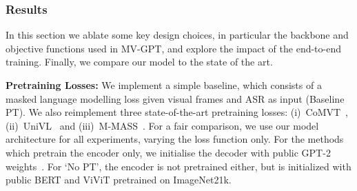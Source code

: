 \documentclass[10pt,twocolumn,letterpaper]{article}
\begin{document}
\subsubsection{Results}
In this section we ablate some key design choices, in particular the backbone and objective functions used in MV-GPT, and explore the impact of the end-to-end training.
Finally, we compare our model to the state of the art.


\begin{table}[t]
    \centering
    \caption{
    Comparisons to existing pretraining losses on YouCook2. 
    \textbf{PT} stands for pretraining. \textbf{PT parts} indicates which part of the model are pretrained, encoder (E) or both encoder and decoder (E + D).
    We reimplement the loss functions of existing methods but use our model and training strategies for fair comparison. 
    } 
    \label{tab:comps-loss}
\end{table}



\noindent\textbf{Pretraining Losses:} 
We implement a simple baseline, which consists of a masked language modelling loss given visual frames and ASR as input (Baseline PT). 
We also reimplement three state-of-the-art pretraining losses: (i)~CoMVT~\cite{seo2021look}, (ii)~UniVL~\cite{luo2020univl} and (iii)~M-MASS~\cite{huang2020multimodal}. For a fair comparison, we use our model architecture for all experiments, varying the loss function only. For the methods which pretrain the encoder only, we initialise the decoder with public GPT-2 weights~\cite{radford2019language}. 
For `No PT', the encoder is not pretrained either, but is initialized with public BERT and ViViT pretrained on ImageNet21k.
\end{document}

